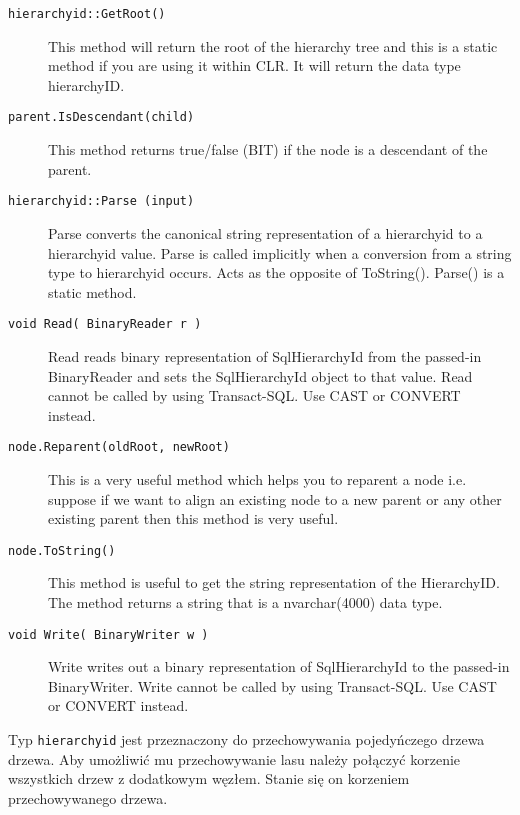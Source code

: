 \begin{description}
  \item[\texttt{hierarchyid::GetRoot()}] 
	This method will return the root of the hierarchy tree and this is a static method if you are using it within CLR. 
	It will return the data type hierarchyID. 

  \item[\texttt{parent.IsDescendant(child)}] 
	This method returns true/false (BIT) if the node is a descendant of the parent. 

  \item[\texttt{hierarchyid::Parse (input)}] 
	Parse converts the canonical string representation of a hierarchyid to a hierarchyid value. 
	Parse is called implicitly when a conversion from a string type to hierarchyid occurs. 
	Acts as the opposite of ToString(). 
	Parse() is a static method. 

  \item[\texttt{void Read( BinaryReader r )}] 
	Read reads binary representation of SqlHierarchyId from the passed-in BinaryReader and sets the SqlHierarchyId object to that value. 
	Read cannot be called by using Transact-SQL. Use CAST or CONVERT instead.

  \item[\texttt{node.Reparent(oldRoot, newRoot)}] 
	This is a very useful method which helps you to reparent a node i.e. suppose if we want to align an existing node 
	to a new parent or any other existing parent then this method is very useful. 

  \item[\texttt{node.ToString()}] 
	This method is useful to get the string representation of the HierarchyID. 
	The method returns a string that is a nvarchar(4000) data type.


  \item[\texttt{void Write( BinaryWriter w )}] 
	Write writes out a binary representation of SqlHierarchyId to the passed-in BinaryWriter. 
	Write cannot be called by using Transact-SQL. Use CAST or CONVERT instead.

 \end{description}



Typ \texttt{hierarchyid} jest przeznaczony do przechowywania pojedyńczego drzewa drzewa.
Aby umożliwić mu przechowywanie lasu należy połączyć korzenie wszystkich drzew z dodatkowym węzłem.
Stanie się on korzeniem przechowywanego drzewa.

